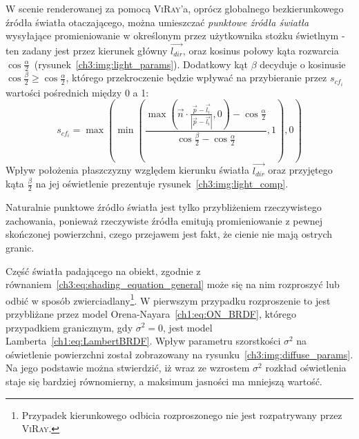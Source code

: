 \begin{enumerate}
W scenie renderowanej za pomocą \textsc{ViRay}'a, oprócz globalnego bezkierunkowego źródła światła otaczającego, można umieszczać \textit{punktowe źródła światła} wysyłające promieniowanie w określonym przez użytkownika stożku świetlnym - ten zadany jest przez kierunek główny $\overrightarrow{l_{dir}}$, oraz kosinus połowy kąta rozwarcia $\cos \frac{\alpha}{2}$~(rysunek~\ref{ch3:img:light_params}). Dodatkowy kąt $\beta$ decyduje o kosinusie $\cos\frac{\beta}{2} \geq \cos\frac{\alpha}{2}$, którego przekroczenie będzie wpływać na przybieranie przez $s_{cf_i}$ wartości pośrednich między 0 a 1:
\begin{equation}
s_{cf_i} = \max\left(\min\left(  \frac{\max\left(\vec{n} \cdot \frac{\vec{p} - \vec{l_i}}{|\vec{p} - \vec{l_i}|}  , 0\right) - \cos\frac{\alpha}{2}}{\cos\frac{\beta}{2} - \cos\frac{\alpha}{2}}, 1\right), 0\right)
\end{equation}
Wpływ położenia płaszczyzny względem kierunku światła $\overrightarrow{l_{dir}}$ oraz przyjętego kąta $\frac{\beta}{2}$ na jej oświetlenie prezentuje rysunek~\ref{ch3:img:light_comp}.

Naturalnie punktowe źródło światła jest tylko przybliżeniem rzeczywistego zachowania, ponieważ rzeczywiste źródła emitują promieniowanie z pewnej skończonej powierzchni, czego przejawem jest fakt, że cienie nie mają ostrych granic. 



Część światła padającego na obiekt, zgodnie z równaniem~\eqref{ch3:eq:shading_equation_general} może się na nim rozproszyć lub odbić w sposób zwierciadlany\footnote{Przypadek kierunkowego odbicia rozproszonego nie jest rozpatrywany przez \textsc{ViRay}.}. W pierwszym przypadku rozproszenie to jest przybliżane przez model Orena-Nayara~\eqref{ch1:eq:ON_BRDF}, którego przypadkiem granicznym, gdy $\sigma^2 = 0$, jest model Lamberta~\eqref{ch1:eq:LambertBRDF}. Wpływ parametru szorstkości $\sigma^2$ na oświetlenie powierzchni został zobrazowany na rysunku~\ref{ch3:img:diffuse_params}. Na jego podstawie można stwierdzić, iż wraz ze wzrostem $\sigma^2$ rozkład oświetlenia staje się bardziej równomierny, a maksimum jasności ma mniejszą wartość. 


\end{enumerate}
